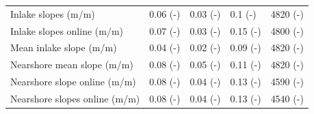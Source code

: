 \documentclass[draft,wrr]{agutexSI2019}
\begin{document}
\begin{table}
\begin{tabular}{lllll}
            Inlake slopes (m/m)                 & 0.06 (-)    & 0.03 (-)    & 0.1 (-)      & 4820 (-)     \\
            Inlake slopes online (m/m)          & 0.07 (-)    & 0.03 (-)    & 0.15 (-)     & 4800 (-)     \\
            Mean inlake slope (m/m)             & 0.04 (-)    & 0.02 (-)    & 0.09 (-)     & 4820 (-)     \\
            Nearshore mean slope (m/m)          & 0.08 (-)    & 0.05 (-)    & 0.11 (-)     & 4820 (-)     \\
            Nearshore slope online (m/m)        & 0.08 (-)    & 0.04 (-)    & 0.13 (-)     & 4590 (-)     \\
            Nearshore slopes online (m/m)       & 0.08 (-)    & 0.04 (-)    & 0.13 (-)     & 4540 (-)     \\
            \hline
      \end{tabular}
\end{table}
\end{document}
